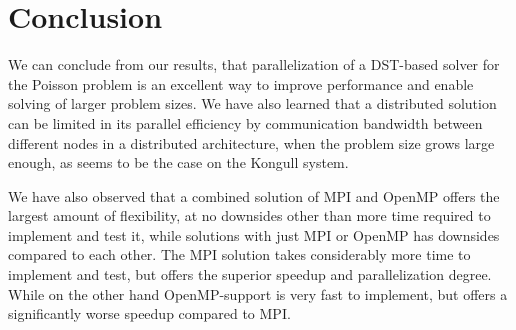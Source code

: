 \documentclass[fontsize=11pt,paper=a4,titlepage]{article}
\begin{document}
\section{Conclusion}

We can conclude from our results, that parallelization of a DST-based solver for
the Poisson problem is an excellent way to improve performance and enable
solving of larger problem sizes. We have also learned that a distributed
solution can be limited in its parallel efficiency by communication bandwidth
between different nodes in a distributed architecture, when the problem size
grows large enough, as seems to be the case on the Kongull system.

We have also observed that a combined solution of MPI and OpenMP offers the
largest amount of flexibility, at no downsides other than more time required to
implement and test it, while solutions with just MPI or OpenMP has downsides
compared to each other. The MPI solution takes considerably more time to
implement and test, but offers the superior speedup and parallelization degree.
While on the other hand OpenMP-support is very fast to implement, but offers a
significantly worse speedup compared to MPI.




{}

\end{document}
